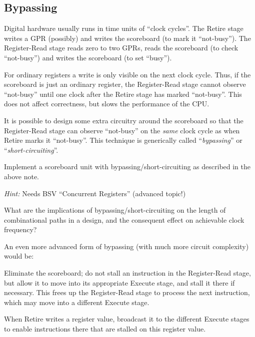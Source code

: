 
\subsection{Bypassing}


Digital hardware usually runs in time units of ``clock cycles''.  The
Retire stage writes a GPR (possibly) and writes the scoreboard (to
mark it ``not-busy'').  The Register-Read stage reads zero to two
GPRs, reads the scoreboard (to check ``not-busy'') and writes the
scoreboard (to set ``busy'').

\vspace{1ex}

For ordinary registers a write is only visible on the next clock
cycle.  Thus, if the scoreboard is just an ordinary register, the
Register-Read stage cannot observe ``not-busy'' until one clock after
the Retire stage has marked ``not-busy''.  This does not affect
correctness, but slows the performance of the CPU.

\vspace{1ex}

It is possible to design some extra circuitry around the scoreboard so
that the Register-Read stage can observe ``not-busy'' on the
\emph{same} clock cycle as when Retire marks it ``not-busy''.  This
technique is generically called ``\emph{bypassing}'' or
``\emph{short-circuiting}''.

\hdivider

\Exercise

Implement a scoreboard unit with bypassing/short-circuiting as
described in the above note.

\emph{Hint:} Needs BSV ``Concurrent Registers'' (advanced topic!)

\Exercise

What are the implications of bypassing/short-circuiting on the length
of combinational paths in a design, and the consequent effect on
achievable clock frequency?

\Endexercise

An even more advanced form of bypassing (with much more circuit
complexity) would be:

\begin{tightlist}

 \item Eliminate the scoreboard; do not stall an instruction in the
     Register-Read stage, but allow it to move into its appropriate
     Execute stage, and stall it there if necessary.  This frees up
     the Register-Read stage to process the next instruction, which
     may move into a different Execute stage.

 \item When Retire writes a register value, broadcast it to the
     different Execute stages to enable instructions there that are
     stalled on this register value.

\end{tightlist}

